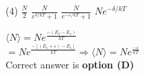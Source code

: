 \begin{enumerate}
{	}
\begin{tasks}(4)
\task[\textbf{A.}] $\frac{N}{2}$
\task[\textbf{B.}] $\frac{N}{e^{\delta / k T}+1}$ 
\task[\textbf{C.}] $\frac{N}{e^{-\varepsilon / k T}+1}$
\task[\textbf{D.}] $N e^{-\delta / k T}$
\end{tasks}
\begin{answer}
$\langle N\rangle=N e^{\frac{-\left(E_{2}-E_{1}\right)}{k T}}$\\
$=N e^{\frac{-\left[\left(E_{1}+\varepsilon\right)-E_{1}\right]}{k T}} \Rightarrow\langle N\rangle=N e^{\frac{-\varepsilon}{k T}}$\\
Correct answer is \textbf{option (D)}
\end{answer}
	
	
	
	
	
	
	
	
	
	
	
	
	
	
	
	
	
	
\end{enumerate}